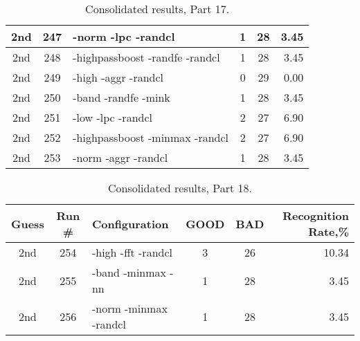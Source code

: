 \begin{table}
\begin{minipage}[b]{\textwidth}
\begin{tabular}{|c|c|l|c|c|r|}
2nd & 247 & -norm -lpc -randcl  & 1 & 28 & 3.45\\ \hline
2nd & 248 & -highpassboost -randfe -randcl  & 1 & 28 & 3.45\\ \hline
2nd & 249 & -high -aggr -randcl  & 0 & 29 & 0.00\\ \hline
2nd & 250 & -band -randfe -mink  & 1 & 28 & 3.45\\ \hline
2nd & 251 & -low -lpc -randcl  & 2 & 27 & 6.90\\ \hline
2nd & 252 & -highpassboost -minmax -randcl  & 2 & 27 & 6.90\\ \hline
2nd & 253 & -norm -aggr -randcl  & 1 & 28 & 3.45\\ \hline
\end{tabular}
\end{minipage}
\caption{Consolidated results, Part 17.}
\label{tab:results17}
\end{table}

\begin{table}
\begin{minipage}[b]{\textwidth}
\centering
\begin{tabular}{|c|c|l|c|c|r|} \hline
Guess & Run \# & Configuration & GOOD & BAD & Recognition Rate,\%\\ \hline\hline
2nd & 254 & -high -fft -randcl  & 3 & 26 & 10.34\\ \hline
2nd & 255 & -band -minmax -nn  & 1 & 28 & 3.45\\ \hline
2nd & 256 & -norm -minmax -randcl  & 1 & 28 & 3.45\\ \hline
\end{tabular}
\end{minipage}
\caption{Consolidated results, Part 18.}
\label{tab:results18}
\end{table}

